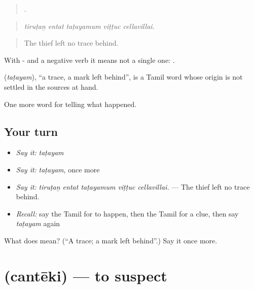 \begin{quote}
    .
\end{quote}

\begin{quote}
\emph{tiruṭaṉ entat taṭayamum viṭṭuc cellavillai.}
\end{quote}

\begin{quote}
The thief left no trace behind.
\end{quote}

With - and a negative verb it means not a single one:   .

\begin{cousinweb}
\textbf{} (\emph{taṭayam}), \textquotedblleft{}a trace, a mark left behind\textquotedblright{}, is a Tamil word whose origin is not settled in the sources at hand.
\end{cousinweb}

\begin{grammarlens}[title={What you've built}]
One more word for telling what happened.
\end{grammarlens}

\subsection*{Your turn}
\begin{itemize}
\raggedright
  \item \emph{Say it:} \emph{taṭayam}
  \item \emph{Say it:} \emph{taṭayam}, once more
  \item \emph{Say it:} \emph{tiruṭaṉ entat taṭayamum viṭṭuc cellavillai.} — The thief left no trace behind.
  \item \emph{Recall:} say the Tamil for to happen, then the Tamil for a clue, then say \emph{taṭayam} again
\end{itemize}

\begin{tcolorbox}[breakable,colback=teal!4,colframe=teal!35!black,title={Before you move on}]
What does  mean? (\textquotedblleft{}A trace; a mark left behind\textquotedblright{}.) Say it once more.
\end{tcolorbox}
\section[\texorpdfstring{\ta{சந்தேகி} (cantēki)}{சந்தேகி (cantēki)}]{ (cantēki) — to suspect}

